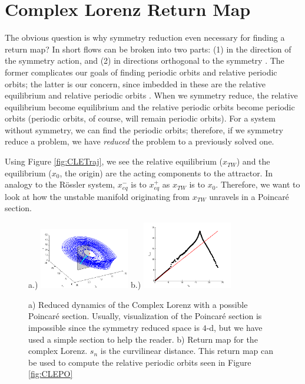 \documentclass[aip,cha,reprint,
secnumarabic,
nofootinbib, tightenlines,
nobibnotes, showkeys, showpacs,
groupedaddress
]{revtex4-1}
\begin{document}
\section{Complex Lorenz Return Map}
\label{sec:CLE}
The obvious question is why symmetry reduction even necessary for finding a return map?  In short flows can be broken into two parts: (1) in the direction of the symmetry action, and (2) in directions orthogonal to the symmetry \cite{CB, Eth, Atl}.  The former complicates our goals of finding periodic orbits and relative periodic orbits; the latter is our concern, since imbedded in these are the relative equilibrium and relative periodic orbits \cite{Atl}.  When we symmetry reduce, the relative equilibrium become equilibrium and the relative periodic orbits become periodic orbits (periodic orbits, of course, will remain periodic orbits).  For a system without symmetry, we can find the periodic orbits; therefore, if we symmetry reduce a problem, we have \emph{reduced} the problem to a previously solved one.

Using Figure \ref{fig:CLETraj}, we see the relative equilibrium ($x_{TW}$) and the equilibrium ($x_0$, the origin) are the acting components to the attractor.  In analogy to the R\"ossler system, $x_{eq}^{-}$ is to $x_{eq}^{+}$ as $x_{TW}$ is to $x_0$.  Therefore, we want to look at how the unstable manifold originating from $x_{TW}$ unravels in a Poincar\'e section.
\begin{figure}[h]
\centering
a.)  \includegraphics[width=0.35\textwidth]{Figs/Section3/kcCLEredaxisonPSc.png}
b.)
  \includegraphics[width=0.35\textwidth]{Figs/Section3/kcCLEretmap.png}
\caption{ a) Reduced dynamics of the Complex Lorenz with a possible Poincar\'e section.  Usually, visualization of the Poincar\'e section is impossible since the symmetry reduced space is $4$-d, but we have used a simple section to help the reader. b) Return map for the complex Lorenz.  $s_n$ is the curvilinear distance.  This return map can be used to compute the relative periodic orbits seen in Figure \ref{fig:CLEPO}
}
 \label{fig:CLEretmap}
\end{figure}
\end{document}
